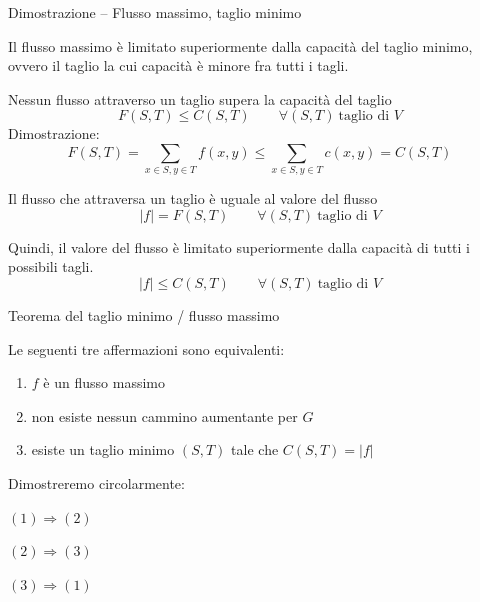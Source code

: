 \begin{frame}{Dimostrazione -- Flusso massimo, taglio minimo}

\vspace{-3pt}
\begin{myboxtitle}
Il \alert{flusso massimo} è limitato superiormente dalla capacità del \alert{taglio minimo}, ovvero il taglio la cui capacità è minore fra tutti i tagli.
\end{myboxtitle}

\begin{overprint}

\medskip
\BIL
\item Nessun flusso attraverso un taglio supera la capacità del taglio
\smallskip
\[
  F(S,T) \leq C(S,T) \qquad \forall (S,T)\ \textrm{taglio di $V$}
\]
Dimostrazione:
\smallskip
\[
  F(S,T) = \sum_{x \in S, y \in T} f(x,y) \leq \sum_{x \in S, y \in T} c(x,y) = C(S,T)
\]
\item Il flusso che attraversa un taglio è uguale al valore del flusso
\smallskip
\[
  |f| = F(S,T) \qquad \forall (S,T)\ \textrm{taglio di $V$}
\]
\EIL
{}

\medskip
\BIL
\item Quindi, il valore del flusso è limitato superiormente dalla capacità
di tutti i possibili tagli. 
\smallskip
\[
|f| \leq C(S,T) \qquad \forall (S,T)\ \textrm{taglio di $V$}
\]
\EIL
\end{overprint}

\end{frame}

\begin{frame}{Teorema del taglio minimo / flusso massimo}

\vspace{-9pt}
\begin{myboxtitle}[Teorema]
Le seguenti tre affermazioni sono equivalenti:
\begin{enumerate}
\item $f$ è un \alert{flusso massimo}
\item non esiste nessun cammino aumentante per $G$
\item esiste un \alert{taglio minimo} $(S,T)$ tale che $C(S,T) = |f|$
\end{enumerate}
\end{myboxtitle}

\bigskip
Dimostreremo circolarmente:
\BIL
\item $(1) \Rightarrow (2)$
\item $(2) \Rightarrow (3)$
\item $(3) \Rightarrow (1)$
\EIL

\end{frame}

